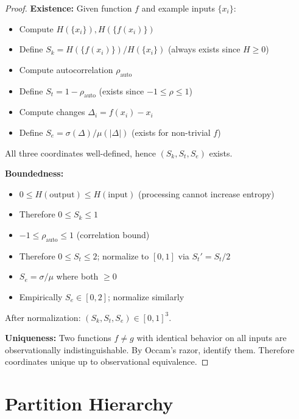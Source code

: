 \documentclass[twocolumn,10pt]{revtex4-2}
\theoremstyle{definition}
\theoremstyle{remark}
\newcommand{\Sk}{S_k}
\newcommand{\St}{S_t}
\newcommand{\Se}{S_e}
\begin{document}
\begin{proof}
\textbf{Existence:} Given function $f$ and example inputs $\{x_i\}$:

\begin{itemize}
\item Compute $H(\{x_i\}), H(\{f(x_i)\})$
\item Define $\Sk = H(\{f(x_i)\}) / H(\{x_i\})$ (always exists since $H \geq 0$)
\item Compute autocorrelation $\rho_{\text{auto}}$
\item Define $\St = 1 - \rho_{\text{auto}}$ (exists since $-1 \leq \rho \leq 1$)
\item Compute changes $\Delta_i = f(x_i) - x_i$
\item Define $\Se = \sigma(\Delta) / \mu(|\Delta|)$ (exists for non-trivial $f$)
\end{itemize}

All three coordinates well-defined, hence $(\Sk, \St, \Se)$ exists.

\vspace{0.2cm}
\noindent\textbf{Boundedness:}
\begin{itemize}
\item $0 \leq H(\text{output}) \leq H(\text{input})$ (processing cannot increase entropy)
\item Therefore $0 \leq \Sk \leq 1$
\item $-1 \leq \rho_{\text{auto}} \leq 1$ (correlation bound)
\item Therefore $0 \leq \St \leq 2$; normalize to $[0,1]$ via $\St' = \St/2$
\item $\Se = \sigma/\mu$ where both $\geq 0$
\item Empirically $\Se \in [0, 2]$; normalize similarly
\end{itemize}

After normalization: $(\Sk, \St, \Se) \in [0,1]^3$.

\vspace{0.2cm}
\noindent\textbf{Uniqueness:} Two functions $f \neq g$ with identical behavior on all inputs are observationally indistinguishable. By Occam's razor, identify them. Therefore coordinates unique up to observational equivalence.
\end{proof}

\section{Partition Hierarchy}
\label{sec:partition_hierarchy}
\end{document}
